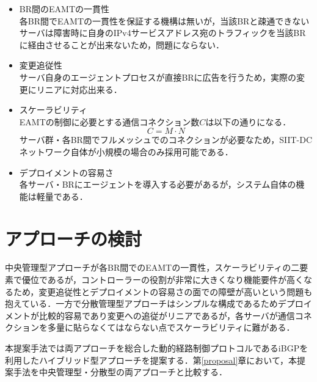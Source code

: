 \begin{itemize}
    \item BR間のEAMTの一貫性 \\
    各BR間でEAMTの一貫性を保証する機構は無いが，当該BRと疎通できないサーバは障害時に自身のIPv4サービスアドレス宛のトラフィックを当該BRに経由させることが出来ないため，問題にならない．
    \item 変更追従性 \\
    サーバ自身のエージェントプロセスが直接BRに広告を行うため，実際の変更にリニアに対応出来る．
    \item スケーラビリティ　\\
    EAMTの制御に必要とする通信コネクション数$C$は以下の通りになる．
    \begin{equation}
        C =  M \cdot N 
    \end{equation}
    サーバ群・各BR間でフルメッシュでのコネクションが必要なため，SIIT-DCネットワーク自体が小規模の場合のみ採用可能である．

    \item デプロイメントの容易さ　\\
    各サーバ・BRにエージェントを導入する必要があるが，システム自体の機能は軽量である．
\end{itemize}

\section{アプローチの検討}

中央管理型アプローチが各BR間でのEAMTの一貫性，スケーラビリティの二要素で優位であるが，コントローラーの役割が非常に大きくなり機能要件が高くなるため，変更追従性とデプロイメントの容易さの面での障壁が高いという問題も抱えている．一方で分散管理型アプローチはシンプルな構成であるためデプロイメントが比較的容易であり変更への追従がリニアであるが，各サーバが通信コネクションを多量に貼らなくてはならない点でスケーラビリティに難がある．

本提案手法では両アプローチを総合した動的経路制御プロトコルであるiBGPを利用したハイブリッド型アプローチを提案する．第\ref{proposal}章において，本提案手法を中央管理型・分散型の両アプローチと比較する．


